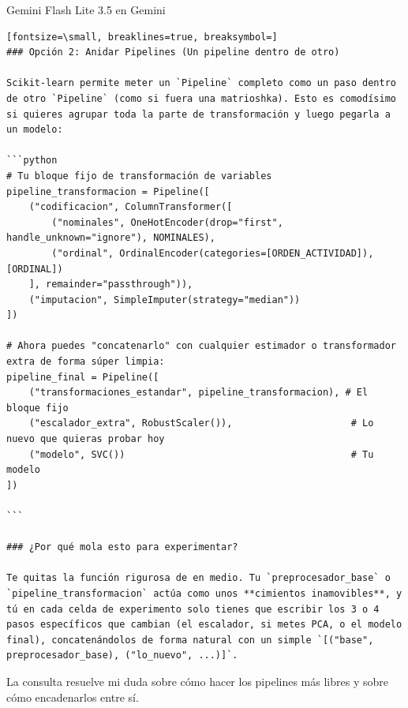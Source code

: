 \documentclass[12pt,a4paper,oneside]{book}
\begin{document}
\begin{iaresp}{Gemini Flash Lite 3.5 en Gemini}
\begin{Verbatim}[fontsize=\small, breaklines=true, breaksymbol=]
### Opción 2: Anidar Pipelines (Un pipeline dentro de otro)

Scikit-learn permite meter un `Pipeline` completo como un paso dentro de otro `Pipeline` (como si fuera una matrioshka). Esto es comodísimo si quieres agrupar toda la parte de transformación y luego pegarla a un modelo:

```python
# Tu bloque fijo de transformación de variables
pipeline_transformacion = Pipeline([
    ("codificacion", ColumnTransformer([
        ("nominales", OneHotEncoder(drop="first", handle_unknown="ignore"), NOMINALES),
        ("ordinal", OrdinalEncoder(categories=[ORDEN_ACTIVIDAD]), [ORDINAL])
    ], remainder="passthrough")),
    ("imputacion", SimpleImputer(strategy="median"))
])

# Ahora puedes "concatenarlo" con cualquier estimador o transformador extra de forma súper limpia:
pipeline_final = Pipeline([
    ("transformaciones_estandar", pipeline_transformacion), # El bloque fijo
    ("escalador_extra", RobustScaler()),                     # Lo nuevo que quieras probar hoy
    ("modelo", SVC())                                        # Tu modelo
])

```

### ¿Por qué mola esto para experimentar?

Te quitas la función rigurosa de en medio. Tu `preprocesador_base` o `pipeline_transformacion` actúa como unos **cimientos inamovibles**, y tú en cada celda de experimento solo tienes que escribir los 3 o 4 pasos específicos que cambian (el escalador, si metes PCA, o el modelo final), concatenándolos de forma natural con un simple `[("base", preprocesador_base), ("lo_nuevo", ...)]`.
\end{Verbatim}
\end{iaresp}
\begin{iaanalisis}
La consulta resuelve mi duda sobre cómo hacer los pipelines más libres y sobre cómo encadenarlos entre sí.
\end{iaanalisis}
\end{document}
